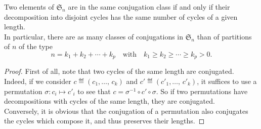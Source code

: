  
\begin{lem}
\label{lem-classes-conjugation-sn}
Two elements of $ \mathfrak{S}_n $ are in the same conjugation class if and only if their decomposition into disjoint cycles has the same number of cycles of a given length. \\In particular, there are as many classes of conjugations in $ \mathfrak{S}_n $ than of partitions of $ n $ of the type
\begin{equation*}
n = k_1 + k_2 + \cdots + k_p \quad \text{with} \quad k_1 \geq k_2 \geq \cdots \geq k_p> 0.
\end{equation*}
\end{lem}
\begin{proof}
First of all, note that two cycles of the same length are conjugated. Indeed, if we consider $ c \eqdef(c_1, \ldots, \, c_k) $ and $ c'\eqdef(c'_1, \ldots, \, c'_{k}) $, it suffices to use a permutation $ \sigma: c_i \mapsto c'_{i} $ to see that $ c = \sigma^{-1} \circ c' \circ \sigma $. So if two permutations have decompositions with cycles of the same length, they are conjugated. \\Conversely, it is obvious that the conjugation of a permutation also conjugates the cycles which compose it, and thus preserves their lengths.
\end{proof}
 
